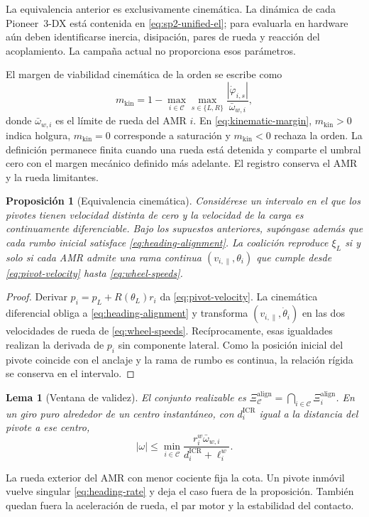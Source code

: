 \documentclass[12pt,a4paper]{article}
\newtheorem{sp2prop}{Proposición}
\newtheorem{sp2lema}{Lema}
\begin{document}
La equivalencia anterior es exclusivamente cinemática. La dinámica de cada
Pioneer~3-DX está contenida en \eqref{eq:sp2-unified-el}; para evaluarla en
hardware aún deben identificarse inercia, disipación, pares de rueda y reacción
del acoplamiento. La campaña actual no proporciona esos parámetros.

El margen de viabilidad cinemática de la orden se escribe como
\begin{equation}
m_{\mathrm{kin}}=
1-\max_{i\in\mathcal C}\max_{s\in\{L,R\}}
\frac{|\dot\varphi_{i,s}|}{\bar\omega_{w,i}},
\label{eq:kinematic-margin}
\end{equation}
donde $\bar\omega_{w,i}$ es el límite de rueda del AMR $i$. En
\eqref{eq:kinematic-margin}, $m_{\mathrm{kin}}>0$ indica holgura,
$m_{\mathrm{kin}}=0$ corresponde a
saturación y $m_{\mathrm{kin}}<0$ rechaza la orden. La definición permanece
finita cuando una rueda está detenida y comparte el umbral cero con el margen
mecánico definido más adelante. El registro conserva el AMR y la rueda limitantes.

\begin{sp2prop}[Equivalencia cinemática]
Considérese un intervalo en el que los pivotes tienen velocidad distinta de cero
y la velocidad de la carga es continuamente diferenciable. Bajo los supuestos
anteriores, supóngase además que cada rumbo inicial satisface
\eqref{eq:heading-alignment}. La coalición reproduce $\xi_L$ si y solo si cada
AMR admite una rama continua $(v_{i,\parallel},\theta_i)$ que cumple desde
\eqref{eq:pivot-velocity} hasta \eqref{eq:wheel-speeds}.
\end{sp2prop}
\begin{proof}
Derivar $p_i=p_L+R(\theta_L)r_i$ da
\eqref{eq:pivot-velocity}. La cinemática diferencial obliga a
\eqref{eq:heading-alignment} y transforma
$(v_{i,\parallel},\dot\theta_i)$ en las dos
velocidades de rueda de \eqref{eq:wheel-speeds}. Recíprocamente, esas igualdades
realizan la derivada de $p_i$ sin componente lateral. Como la posición inicial
del pivote coincide con el anclaje y la rama de rumbo es continua, la relación
rígida se conserva en el intervalo.
\end{proof}

\begin{sp2lema}[Ventana de validez]
El conjunto realizable es
$\Xi_{\mathcal C}^{\mathrm{align}}=
\bigcap_{i\in\mathcal C}\Xi_i^{\mathrm{align}}$. En un giro puro alrededor de
un centro instantáneo, con $d_i^{\mathrm{ICR}}$ igual a la distancia del pivote
a ese centro,
\begin{equation}
|\omega|\leq
\min_{i\in\mathcal C}
\frac{r_i^w\bar\omega_{w,i}}{d_i^{\mathrm{ICR}}+\ell_i^w}.
\label{eq:pure-rotation-bound}
\end{equation}
\end{sp2lema}
La rueda exterior del AMR con menor cociente fija la cota. Un pivote inmóvil
vuelve singular \eqref{eq:heading-rate} y deja el caso fuera de la proposición.
También quedan fuera la aceleración de rueda, el par motor y la estabilidad del
contacto.
\end{document}
